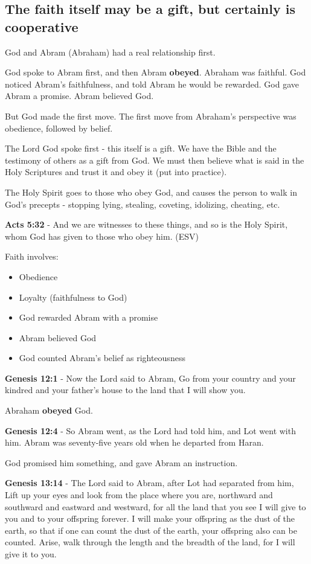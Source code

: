 \documentclass[11pt]{article}
\begin{document}
\subsection{The faith itself may be a gift, but certainly is cooperative}
\label{sec:orge8915fb}
God and Abram (Abraham) had a real relationship first.

God spoke to Abram first, and then Abram \textbf{obeyed}.
Abraham was faithful.
God noticed Abram's faithfulness, and told Abram he would be rewarded.
God gave Abram a promise.
Abram believed God.

But God made the first move.
The first move from Abraham's perspective was obedience, followed by belief.

The Lord God spoke first - this itself is a gift. We have the Bible and the testimony of others as a gift from God.
We must then believe what is said in the Holy Scriptures and trust it and obey it (put into practice).

The Holy Spirit goes to those who obey God, and causes the person to walk in God's precepts - stopping lying, stealing, coveting, idolizing, cheating, etc.

\textbf{Acts 5:32} - And we are witnesses to these things, and so is the Holy Spirit, whom God has given to those who obey him. (ESV)

Faith involves:
\begin{itemize}
\item Obedience
\item Loyalty (faithfulness to God)
\item God rewarded Abram with a promise
\item Abram believed God
\item God counted Abram's belief as righteousness
\end{itemize}

\textbf{Genesis 12:1} - Now the Lord said to Abram, Go from your country and your kindred and your father's house to the land that I will show you.

Abraham \textbf{obeyed} God.

\textbf{Genesis 12:4} - So Abram went, as the Lord had told him, and Lot went with him. Abram was seventy-five years old when he departed from Haran.

God promised him something, and gave Abram an instruction.

\textbf{Genesis 13:14} - The Lord said to Abram, after Lot had separated from him, Lift up your eyes and look from the place where you are, northward and southward and eastward and westward, for all the land that you see I will give to you and to your offspring forever. I will make your offspring as the dust of the earth, so that if one can count the dust of the earth, your offspring also can be counted. Arise, walk through the length and the breadth of the land, for I will give it to you.
\end{document}
